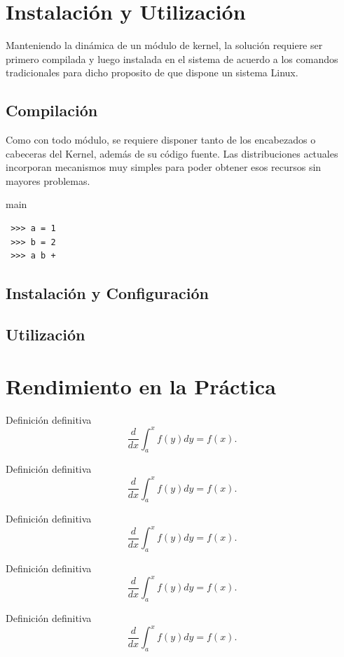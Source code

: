 \section{Instalación y Utilización}
Manteniendo la dinámica de un módulo de kernel, la solución requiere ser primero compilada y luego instalada en el sistema de acuerdo a los comandos tradicionales para dicho proposito de que dispone un sistema Linux.

\subsection{Compilación}
Como con todo módulo, se requiere disponer tanto de los encabezados o cabeceras del Kernel, además de su código fuente. Las distribuciones actuales incorporan mecanismos muy simples para poder obtener esos recursos sin mayores problemas.

\begin{listing}
\caption{main}
\begin{verbatim}
 >>> a = 1 
 >>> b = 2
 >>> a b +
\end{verbatim}
\end{listing}


\subsection{Instalación y Configuración}
\subsection{Utilización}

\section{Rendimiento en la Práctica}

\begin{defn} Definición definitiva $$\frac{d}{dx}\int_a^xf(y)dy=f(x).$$\end{defn}

\begin{teo} Definición definitiva $$\frac{d}{dx}\int_a^xf(y)dy=f(x).$$\end{teo}

\begin{prop} Definición definitiva $$\frac{d}{dx}\int_a^xf(y)dy=f(x).$$\end{prop}

\begin{obs} Definición definitiva $$\frac{d}{dx}\int_a^xf(y)dy=f(x).$$\end{obs}

\begin{ej} Definición definitiva $$\frac{d}{dx}\int_a^xf(y)dy=f(x).$$\end{ej}